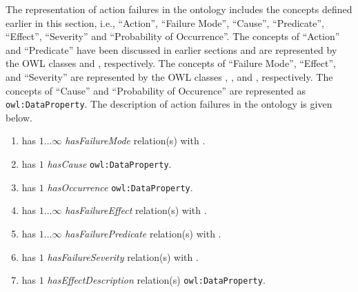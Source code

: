 The representation of action failures in the  ontology includes the concepts defined earlier in this section, i.e., ``Action'', ``Failure Mode'', ``Cause'', ``Predicate'', ``Effect'', ``Severity'' and ``Probability of Occurrence''. The concepts of ``Action'' and ``Predicate'' have been discussed in earlier sections and are represented by the OWL classes  and , respectively. The concepts of ``Failure Mode'', ``Effect'', and ``Severity'' are represented by the OWL classes , , and , respectively. The concepts of ``Cause'' and ``Probability of Occurence'' are represented as \texttt{owl:DataProperty}. The description of action failures in the  ontology is given below.

\begin{enumerate}
 \item {} has $1\ldots\infty$ \textit{hasFailureMode} relation(s) with .
 \item {} has $1$ \textit{hasCause} \texttt{owl:DataProperty}.
 \item {} has $1$ \textit{hasOccurrence} \texttt{owl:DataProperty}.
 \item {} has $1\ldots\infty$ \textit{hasFailureEffect} relation(s) with .
 \item {} has $1\ldots\infty$ \textit{hasFailurePredicate} relation(s) with .
 \item {} has $1$ \textit{hasFailureSeverity} relation(s) with .
  \item {} has $1$ \textit{hasEffectDescription} relation(s) \texttt{owl:DataProperty}.
\end{enumerate}




 

